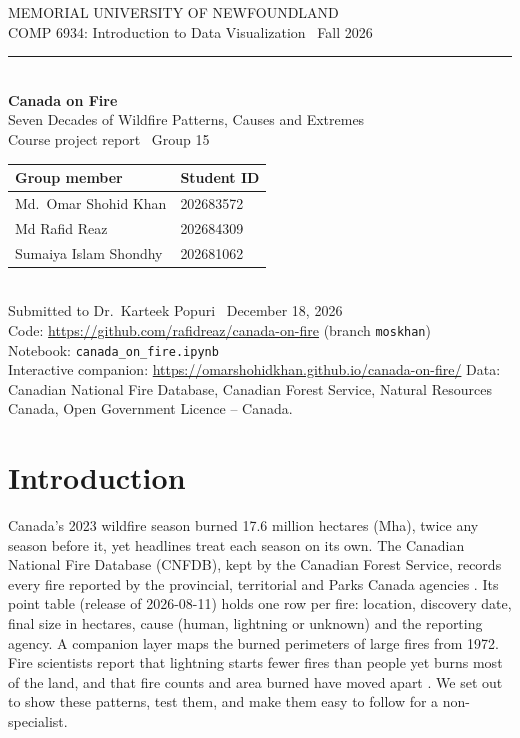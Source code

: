 \documentclass[12pt,letterpaper]{article}
\begin{document}
\begin{titlepage}
  \thispagestyle{empty}
  \vspace*{1.2in}
  {\color{muted}\small MEMORIAL UNIVERSITY OF NEWFOUNDLAND\\[2pt]
   COMP 6934: Introduction to Data Visualization \textperiodcentered\ Fall 2026}\\[0.5in]
  {\color{accent}\rule{0.9in}{2pt}}\\[0.25in]
  {\fontsize{30}{34}\selectfont\bfseries Canada on Fire}\\[0.15in]
  {\Large Seven Decades of Wildfire Patterns, Causes and Extremes}\\[0.3in]
  {\large Course project report \textperiodcentered\ Group 15}\\[0.7in]
  \begin{tabular}{@{}ll@{}}
    \toprule
    \textbf{Group member} & \textbf{Student ID} \\
    \midrule
    Md.\ Omar Shohid Khan    & 202683572 \\
    Md Rafid Reaz            & 202684309 \\
    Sumaiya Islam Shondhy    & 202681062 \\
    \bottomrule
  \end{tabular}\\[0.7in]
  {\small Submitted to Dr.\ Karteek Popuri \textperiodcentered\ December 18, 2026}\\[0.15in]
  {\small\color{muted}Code: \url{https://github.com/rafidreaz/canada-on-fire} (branch \texttt{moskhan})\\ Notebook: \texttt{canada\_on\_fire.ipynb}\\
   Interactive companion: \url{https://omarshohidkhan.github.io/canada-on-fire/}}
  \vfill
  {\footnotesize\color{muted}Data: Canadian National Fire Database, Canadian Forest Service, Natural Resources Canada, Open Government Licence -- Canada.}
\end{titlepage}
\setcounter{page}{1}

\section{Introduction}
Canada's 2023 wildfire season burned 17.6 million hectares (Mha), twice any season before it, yet headlines treat each season on its own. The Canadian National Fire Database (CNFDB), kept by the Canadian Forest Service, records every fire reported by the provincial, territorial and Parks Canada agencies \cite{cnfdb}. Its point table (release of 2026-08-11) holds one row per fire: location, discovery date, final size in hectares, cause (human, lightning or unknown) and the reporting agency. A companion layer maps the burned perimeters of large fires from 1972. Fire scientists report that lightning starts fewer fires than people yet burns most of the land, and that fire counts and area burned have moved apart \cite{hanes}. We set out to show these patterns, test them, and make them easy to follow for a non-specialist.
\end{document}

